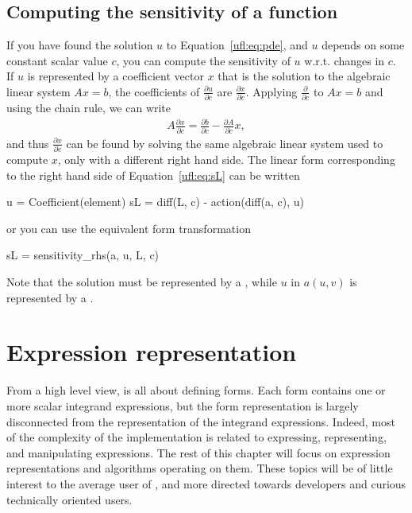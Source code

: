 \subsection{Computing the sensitivity of a function} \label{ufl:sec:sensitivity}
If you have found the solution $u$ to Equation~\eqref{ufl:eq:pde}, and
$u$ depends on some constant scalar value $c$, you can compute the
sensitivity of $u$ w.r.t. changes in $c$.  If $u$ is represented by a
coefficient vector $x$ that is the solution to the algebraic linear
system $A x = b$, the coefficients of $\frac{\partial u}{\partial c}$
are $\frac{\partial x}{\partial c}$.  Applying $\frac{\partial
}{\partial c}$ to $A x = b$ and using the chain rule, we can write
\begin{align}\label{ufl:eq:sL}
A \frac{\partial x}{\partial c} = \frac{\partial b}{\partial c} - \frac{\partial A}{\partial c} x,
\end{align}
and thus $\frac{\partial x}{\partial c}$ can be found by solving the
same algebraic linear system used to compute $x$, only with a
different right hand side.  The linear form corresponding to the right
hand side of Equation~\eqref{ufl:eq:sL} can be written
\begin{python}
u = Coefficient(element)
sL = diff(L, c) - action(diff(a, c), u)
\end{python}
or you can use the equivalent form transformation
\begin{python}
sL = sensitivity_rhs(a, u, L, c)
\end{python}
Note that the solution  must be represented by a
, while $u$ in $a(u, v)$ is represented
by a .


\section{Expression representation} \label{ufl:sec:representation}

From a high level view, \ufl{} is all about defining forms.  Each form
contains one or more scalar integrand expressions, but the form
representation is largely disconnected from the representation of the
integrand expressions.  Indeed, most of the complexity of the \ufl{}
implementation is related to expressing, representing, and
manipulating expressions.  The rest of this chapter will focus on
expression representations and algorithms operating on them.  These
topics will be of little interest to the average user of \ufl{}, and
more directed towards developers and curious technically oriented
users.

